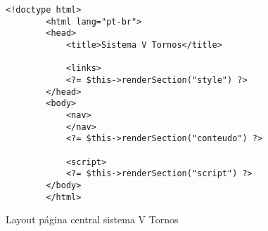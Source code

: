 \begin{figure}
    \centering
    \begin{lstlisting}[style=phplisting]
        <!doctype html>
        <html lang="pt-br">
        <head>
            <title>Sistema V Tornos</title>
            
            <links>
            <?= $this->renderSection("style") ?>
        </head>
        <body>
            <nav>
            </nav>
            <?= $this->renderSection("conteudo") ?>

            <script>
            <?= $this->renderSection("script") ?>
        </body>
        </html>
    \end{lstlisting}
    \caption{Layout página central sistema V Tornos}
    \label{fig:tema_um}
\end{figure}